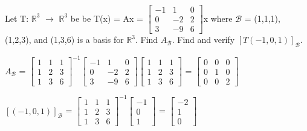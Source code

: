     \vspace{0.5cm}



    \begin{example}
        Let T: $\mathbb{R}^3$ $\rightarrow$ $\mathbb{R}^3$
        be be T(x) = Ax =
        $\begin{bmatrix}
            -1 & 1 & 0 \\
            0 & -2 & 2 \\
            3 & -9 & 6
        \end{bmatrix}$x
        where $\mathcal{B}$ = (1,1,1), (1,2,3), and (1,3,6)
        is a basis for $\mathbb{R}^3$.
        Find $A_{\mathcal{B}}$.
        Find and verify $[T(-1,0,1)]_{\mathcal{B}}$.
    \end{example}

    \begin{tbox}
        $A_{\mathcal{B}}$ =
        $\begin{bmatrix}
            1 & 1 & 1 \\
            1 & 2 & 3 \\
            1 & 3 & 6
        \end{bmatrix}^{-1}
        \begin{bmatrix}
            -1 & 1 & 0 \\
            0 & -2 & 2 \\
            3 & -9 & 6
        \end{bmatrix}
        \begin{bmatrix}
            1 & 1 & 1 \\
            1 & 2 & 3 \\
            1 & 3 & 6
        \end{bmatrix}$ =
        $\begin{bmatrix}
            0 & 0 & 0 \\
            0 & 1 & 0 \\
            0 & 0 & 2
        \end{bmatrix}$

        $[(-1,0,1)]_{\mathcal{B}}$
        = $\begin{bmatrix}
            1 & 1 & 1 \\
            1 & 2 & 3 \\
            1 & 3 & 6
        \end{bmatrix}^{-1}
        \begin{bmatrix}
            -1 \\
            0 \\
            1
        \end{bmatrix}$ =
        $\begin{bmatrix}
            -2 \\
            1 \\
            0
        \end{bmatrix}$


\end{tbox}
